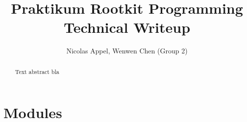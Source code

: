 \documentclass[DIV11,10pt]{scrreprt}
\title{Praktikum Rootkit Programming\\Technical Writeup}
\author{Nicolas Appel, Wenwen Chen (Group 2)}
\begin{document}
\maketitle
\begin{abstract}
Text abstract bla
\end{abstract}
\tableofcontents
\clearpage

\chapter{Modules}


%

\end{document}
